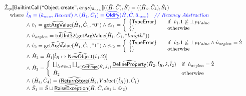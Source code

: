 \documentclass{article}
\newcommand{\SF}[1]{\mbox{\textsf{#1}}}
\newcommand{\comment}[1]{\textit{#1}}
\newcommand{\wherec}[1]{{\rm where}\begin{array}[t]{l}#1\end{array}}
\newcommand{\ifc}[1]{{\rm if}\begin{array}[t]{l}#1\end{array}}
\newcommand{\owc}{{\rm otherwise}}
\newcommand{\aI}{\hat{\mathcal{I}}}
\newcommand{\lbr}{\llbracket}
\newcommand{\rbr}{\rrbracket}
\newcommand{\hf}[1]{\underline{\sf #1}}
\newcommand{\ahf}[1]{\widehat{\underline{\sf #1}}}
\def\inblue{\color{blue}}
\def\inblue{\color{blue}}
\begin{document}
\[
\begin{array}{l}
\aI _{cp}\lbr \SF{BuiltintCall}(``\SF{Object.create}",args)_{\hat{a}_{new}}\rbr((\hat{H},\hat{C}), \hat{S})
  = ((\hat{H}_4, \hat{C}_4), \hat{S}_1)\\
\quad\wherec{
  \inblue\hat{l}_{R} = (\hat{a}_{new}, Recent)
  \land \inblue (\hat{H}_1, \hat{C}_1) = \ahf{Oldify}(\hat{H}, \hat{C}, \hat{a}_{new})
     \quad\comment{{\inblue // Recency Abstraction}}\\
  \land\ \hat{v}_1 =\ahf{getArgValue}(\hat{H}_1, \hat{C}_1, ``0")
  \land \hat{es}_1 =
    \left\{
    \begin{array}{l@{\quad\quad}l}
      \{ \SF{TypeError} \} & \ifc{\hat{v}_1.1 \not\sqsubseteq \bot_{PValue}}\\
      \{ \}& \owc\\
    \end{array}
    \right.\\
  \land\ \hat{n}_{arglen} = \ahf{toUInt32}(\hf{getArgValue}(\hat{H}_1, \hat{C}_1, \hat{``length"}))\\
  \land\ \hat{v}_2 =\ahf{getArgValue}(\hat{H}_1, \hat{C}_1, ``1")
  \land \hat{es}_2 =
    \left\{
    \begin{array}{l@{\quad\quad}l}
      \{ \SF{TypeError} \} & \ifc{\hat{v}_2.1 \not\sqsubseteq \bot_{PValue} \land \hat{n}_{arglen} = \hat{2}}\\
      \{ \}& \owc\\
    \end{array}
    \right.\\
  \land\ \hat{H}_2 = \hat{H}_1[\hat{l}_R \mapsto \ahf{NewObject}(\hat{v}_1.2)]\\
  \land\ \hat{H}_3 = \left\{\begin{array}{ll}
      \bigsqcup_{\hat{l}_2 \in \hat{v}_2.2} \bigsqcup_{s \in \ahf{GetProps}(\hat{H}_2, \hat{l}_2)}
        \ahf{DefineProperty}(\hat{H}_2, \hat{l}_R, \hat{s}, \hat{l}_2)
      & \ifc{\hat{n}_{arglen} = \hat{2}}\\
      \hat{H}_2 & \owc
    \end{array}\right.\\
  \land\ (\hat{H}_4, \hat{C}_4) = (\ahf{ReturnStore}(\hat{H}_2, Value(\{ \hat{l}_R\}), \hat{C}_1)\\
  \land\ \hat{S}_1 = \hat{S} \sqcup \ahf{RaiseException}(\hat{H}, \hat{C}, \hat{es}_1 \sqcup \hat{es}_2)\\
  }\\
\\\\ 



\end{array}\]
\end{document}
